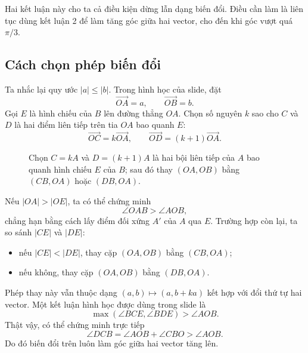 \documentclass[11pt]{article}
\newcommand{\abs}[1]{\left|#1\right|}
\newcommand{\vect}[1]{\overrightarrow{#1}}
\begin{document}
Hai kết luận này cho ta cả điều kiện dừng lẫn dạng biến đổi. Điều cần làm là
liên tục dùng kết luận 2 để làm tăng góc giữa hai vector, cho đến khi góc vượt
quá $\pi/3$.

\subsection{Cách chọn phép biến đổi}

Ta nhắc lại quy ước $\abs a\le\abs b$. Trong hình học của slide, đặt
\[
  \vect{OA}=a,\qquad \vect{OB}=b.
\]
Gọi $E$ là hình chiếu của $B$ lên đường thẳng $OA$. Chọn số nguyên $k$ sao cho
$C$ và $D$ là hai điểm liên tiếp trên tia $OA$ bao quanh $E$:
\[
  \vect{OC}=k\vect{OA},\qquad
  \vect{OD}=(k+1)\vect{OA}.
\]

\begin{figure}[ht]
\centering
{}
\caption{Chọn \(C=kA\) và \(D=(k+1)A\) là hai bội liên tiếp của \(A\) bao quanh hình chiếu \(E\) của \(B\); sau đó thay \((OA,OB)\) bằng \((CB,OA)\) hoặc \((DB,OA)\).}
\end{figure}

Nếu $\abs{OA}>\abs{OE}$, ta có thể chứng minh
\[
  \angle OAB>\angle AOB,
\]
chẳng hạn bằng cách lấy điểm đối xứng $A'$ của $A$ qua $E$. Trường hợp còn
lại, ta so sánh $\abs{CE}$ và $\abs{DE}$:
\begin{itemize}
  \item nếu $\abs{CE}<\abs{DE}$, thay cặp $(OA,OB)$ bằng $(CB,OA)$;
  \item nếu không, thay cặp $(OA,OB)$ bằng $(DB,OA)$.
\end{itemize}

Phép thay này vẫn thuộc dạng $(a,b)\mapsto(a,b+ka)$ kết hợp với đổi thứ tự hai
vector. Một kết luận hình học được dùng trong slide là
\[
  \max(\angle BCE,\angle BDE)>\angle AOB.
\]
Thật vậy, có thể chứng minh trực tiếp
\[
  \angle DCB=\angle AOB+\angle CBO>\angle AOB.
\]
Do đó biến đổi trên luôn làm góc giữa hai vector tăng lên.
\end{document}
